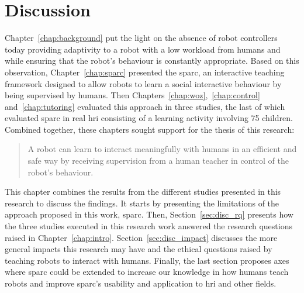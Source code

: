 \chapter{Discussion} \label{chap:discussion}
\glsresetall

Chapter~\ref{chap:background} put the light on the absence of robot controllers today providing adaptivity to a robot with a low workload from humans and while ensuring that the robot's behaviour is constantly appropriate. Based on this observation, Chapter~\ref{chap:sparc} presented the \gls{sparc}, an interactive teaching framework designed to allow robots to learn a social interactive behaviour by being supervised by humans. Then Chapters~\ref{chap:woz},~\ref{chap:control} and~\ref{chap:tutoring} evaluated this approach in three studies, the last of which evaluated \gls{sparc} in real \gls{hri} consisting of a learning activity involving 75 children. Combined together, these chapters sought support for the thesis of this research:

\begin{quote}
	A robot can learn to interact meaningfully with humans in an efficient and safe way by receiving supervision from a human teacher in control of the robot's behaviour.
\end{quote}

This chapter combines the results from the different studies presented in this research to discuss the findings. It starts by presenting the limitations of the approach proposed in this work, \gls{sparc}. Then, Section~\ref{sec:disc_rq} presents how the three studies executed in this research work answered the research questions raised in Chapter~\ref{chap:intro}. Section~\ref{sec:disc_impact} discusses the more general impacts this research may have and the ethical questions raised by teaching robots to interact with humans.
Finally, the last section proposes axes where \gls{sparc} could be extended to increase our knowledge in how humans teach robots and improve \gls{sparc}'s usability and application to \gls{hri} and other fields.


